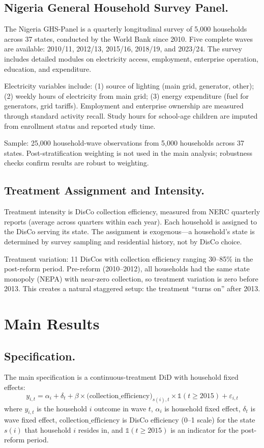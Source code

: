\documentclass[12pt]{article}
\begin{document}
\subsection*{Nigeria General Household Survey Panel.}
The Nigeria GHS-Panel is a quarterly longitudinal survey of 5,000 households across 37 states, conducted by the World Bank since 2010. Five complete waves are available: 2010/11, 2012/13, 2015/16, 2018/19, and 2023/24. The survey includes detailed modules on electricity access, employment, enterprise operation, education, and expenditure.

Electricity variables include: (1) source of lighting (main grid, generator, other); (2) weekly hours of electricity from main grid; (3) energy expenditure (fuel for generators, grid tariffs). Employment and enterprise ownership are measured through standard activity recall. Study hours for school-age children are imputed from enrollment status and reported study time.

Sample: 25,000 household-wave observations from 5,000 households across 37 states. Post-stratification weighting is not used in the main analysis; robustness checks confirm results are robust to weighting.

\subsection*{Treatment Assignment and Intensity.}
Treatment intensity is DisCo collection efficiency, measured from NERC quarterly reports (average across quarters within each year). Each household is assigned to the DisCo serving its state. The assignment is exogenous---a household's state is determined by survey sampling and residential history, not by DisCo choice.

Treatment variation: 11 DisCos with collection efficiency ranging 30--85\% in the post-reform period. Pre-reform (2010--2012), all households had the same state monopoly (NEPA) with near-zero collection, so treatment variation is zero before 2013. This creates a natural staggered setup: the treatment ``turns on'' after 2013.

\section{Main Results}



\subsection*{Specification.}
The main specification is a continuous-treatment DiD with household fixed effects:
$$y_{i,t} = \alpha_i + \delta_t + \beta \times \text{(collection\_efficiency)}_{s(i),t} \times \mathbb{1}(t \geq 2015) + \varepsilon_{i,t}$$
where $y_{i,t}$ is the household $i$ outcome in wave $t$, $\alpha_i$ is household fixed effect, $\delta_t$ is wave fixed effect, $\text{collection\_efficiency}$ is DisCo efficiency (0--1 scale) for the state $s(i)$ that household $i$ resides in, and $\mathbb{1}(t \geq 2015)$ is an indicator for the post-reform period.
\end{document}
